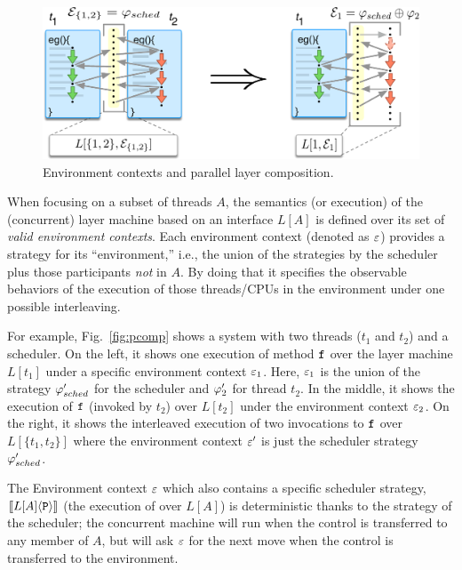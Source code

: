 \begin{figure}[t]
\centering
\includegraphics[width=\textwidth]{figs/ccal/pcomp}
\caption{Environment contexts and parallel layer composition.}
\label{fig:chapter:ccal:env-contexs-andparallel-layer-composition}
\end{figure}




When focusing on a subset of threads $A$, the semantics (or execution) of the (concurrent) layer machine based on an
interface $L[A]$ is defined over its set of \emph{valid environment
contexts}. 
Each environment context (denoted as $\oracle$) provides a
strategy for its ``environment,'' i.e., the union of the strategies
by the scheduler plus those participants {\em not} in $A$.
By doing that it specifies the observable behaviors of the
execution of those threads/CPUs in the environment under one possible
interleaving.


For example, Fig.~\ref{fig:pcomp} shows a system with two threads
($t_1$ and $t_2$) and a scheduler. On the left, it shows one execution
of method ${\mathrm{\texttt{f}}}$ over the layer machine $L[t_1]$ under a specific
environment context $\oracle_1$.  Here, $\oracle_1$ is the union of
the strategy $\varphi'_{sched}$ for the scheduler and $\varphi'_{2}$ for
thread $t_2$. In the middle, it shows the execution of ${\mathrm{\texttt{f}}}$
(invoked by $t_2$) over $L[t_2]$ under the environment context
$\oracle_2$. On the right, it shows the interleaved execution of
two invocations to ${\mathrm{\texttt{f}}}$ over $L[\{t_1,t_2\}]$
where the environment context $\oracle'$ is just the scheduler
strategy $\varphi'_{sched}$.

The Environment context $\oracle$ which also contains a specific
scheduler strategy, $[\![{L[A]} \langle {{\mathrm{\texttt{P}}}} \rangle]\!]$ (the execution of  over $L[A]$) is
deterministic thanks to the strategy of the scheduler; 
the concurrent machine will run  when the control is
transferred to any member of $A$, but will ask $\oracle$ for the next 
move when the control is transferred to the environment.

